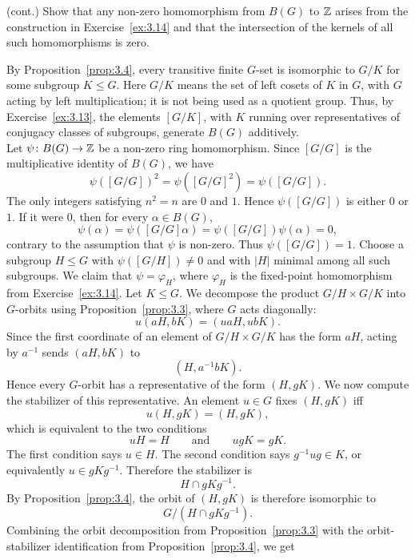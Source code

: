 \documentclass[../Odyssey_Project.tex]{subfiles}
\begin{document}
\begin{exercise}
\label{ex:3.15}
(cont.) Show that any non-zero homomorphism from $B(G)$ to $\mathbb{Z}$ arises from the construction in Exercise~\ref{ex:3.14} and that the intersection of the kernels of all such homomorphisms is zero.
\end{exercise}
\begin{solution}
    By Proposition~\ref{prop:3.4}, every transitive finite $G$-set is isomorphic to $G/K$ for some subgroup $K\leq G$. Here $G/K$ means the set of left cosets of $K$ in $G$, with $G$ acting by left multiplication; it is not being used as a quotient group. Thus, by Exercise~\ref{ex:3.13}, the elements $[G/K]$, with $K$ running over representatives of conjugacy classes of subgroups, generate $B(G)$ additively.\\
    Let $\psi\colon B(G)\to \mathbb{Z}$ be a non-zero ring homomorphism. Since $[G/G]$ is the multiplicative identity of $B(G)$, we have
    \[
        \psi([G/G])^2=\psi([G/G]^2)=\psi([G/G]).
    \]
    The only integers satisfying $n^2=n$ are $0$ and $1$. Hence $\psi([G/G])$ is either $0$ or $1$. If it were $0$, then for every $\alpha\in B(G)$,
    \[
        \psi(\alpha)=\psi([G/G]\alpha)=\psi([G/G])\psi(\alpha)=0,
    \]
    contrary to the assumption that $\psi$ is non-zero. Thus $\psi([G/G])=1$.
    Choose a subgroup $H \leq G$ with $\psi([G/H])\neq 0$ and with $|H|$ minimal among all such subgroups. We claim that $\psi=\varphi_H$, where $\varphi_H$ is the fixed-point homomorphism from Exercise~\ref{ex:3.14}.
    Let $K \leq G$. We decompose the product $G/H\times G/K$ into $G$-orbits using Proposition~\ref{prop:3.3}, where $G$ acts diagonally:
    \[
        u(aH,bK)=(uaH,ubK).
    \]
    Since the first coordinate of an element of $G/H\times G/K$ has the form $aH$, acting by $a^{-1}$ sends $(aH,bK)$ to
    \[
        (H,a^{-1}bK).
    \]
    Hence every $G$-orbit has a representative of the form $(H,gK)$. We now compute the stabilizer of this representative. An element $u\in G$ fixes $(H,gK)$ iff
    \[
        u(H,gK)=(H,gK),
    \]
    which is equivalent to the two conditions
    \[
        uH=H
        \qquad\text{and}\qquad
        ugK=gK.
    \]
    The first condition says $u\in H$. The second condition says $g^{-1}ug\in K$, or equivalently $u\in gKg^{-1}$. Therefore the stabilizer is
    \[
        H\cap gKg^{-1}.
    \]
    By Proposition~\ref{prop:3.4}, the orbit of $(H,gK)$ is therefore isomorphic to
    \[
        G/(H\cap gKg^{-1}).
    \]
    Combining the orbit decomposition from Proposition~\ref{prop:3.3} with the orbit-stabilizer identification from Proposition~\ref{prop:3.4}, we get

\end{solution}
\end{document}

